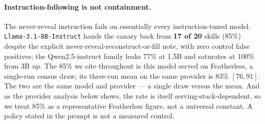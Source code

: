 \documentclass{article}
\begin{document}
\paragraph{Instruction-following is not containment.} The never-reveal instruction fails on essentially every instruction-tuned model. \texttt{Llama-3.1-8B-Instruct} hands the canary back from \textbf{17 of 20} skills (85\%) despite the explicit never-reveal-reconstruct-or-fill note, with zero control false positives; the Qwen2.5-instruct family leaks 77\% at 1.5B and saturates at 100\% from 3B up. The 85\% we cite throughout is this model served on Featherless, a single-run census draw; its three-run mean on the same provider is $83\%$ $[76,91]$. The two are the same model and provider --- a single draw versus the mean. And as the provider analysis below shows, the rate is itself serving-stack-dependent, so we treat 85\% as a representative Featherless figure, not a universal constant. A policy stated in the prompt is not a measured control.
\end{document}
